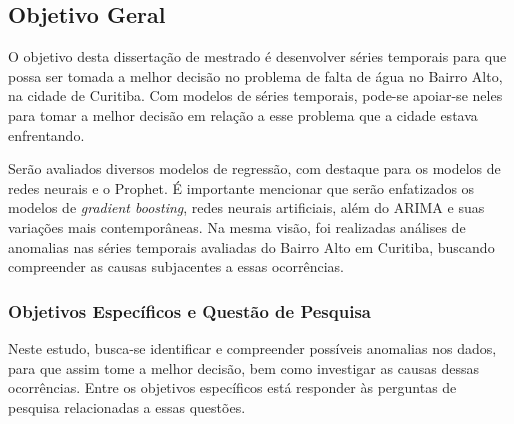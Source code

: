 \subsection{Objetivo Geral} \label{subsec:objetivos}

O objetivo desta dissertação de mestrado é desenvolver séries temporais para que possa ser tomada a melhor decisão no problema de falta de água no Bairro Alto, na cidade de Curitiba. Com modelos de séries temporais, pode-se apoiar-se neles para tomar a melhor decisão em relação a esse problema que a cidade estava enfrentando.

Serão avaliados diversos modelos de regressão, com destaque para os modelos de redes neurais e o Prophet. É importante mencionar que serão enfatizados os modelos de \textit{gradient boosting}, redes neurais artificiais, além do ARIMA e suas variações mais contemporâneas. Na mesma visão, foi realizadas análises de anomalias nas séries temporais avaliadas do Bairro Alto em Curitiba, buscando compreender as causas subjacentes a essas ocorrências.
    
    
    \subsubsection{Objetivos Espec\'ificos e Quest\~ao de Pesquisa} \label{subsubsec:obespec}
    
Neste estudo, busca-se identificar e compreender possíveis anomalias nos dados, para que assim tome a melhor decisão, bem como investigar as causas dessas ocorrências. Entre os objetivos específicos está responder às perguntas de pesquisa relacionadas a essas questões.

